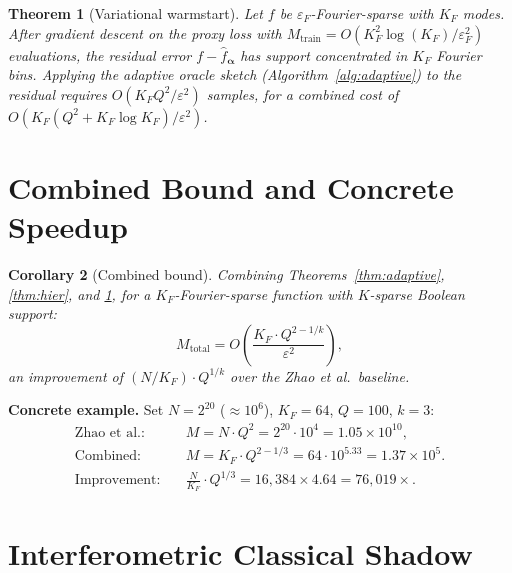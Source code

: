 \documentclass[11pt]{article}
\newtheorem{theorem}{Theorem}
\newtheorem{corollary}[theorem]{Corollary}
\newcommand{\eps}{\varepsilon}
\begin{document}
\begin{theorem}[Variational warmstart]\label{thm:var}
Let $f$ be $\eps_F$-Fourier-sparse with $K_F$ modes.  After gradient descent on the proxy loss with $M_{\mathrm{train}} = O(K_F^2\log(K_F)/\eps_F^2)$ evaluations, the residual error $f - \hat{f}_{\boldsymbol{\alpha}}$ has support concentrated in $K_F$ Fourier bins.  Applying the adaptive oracle sketch (Algorithm~\ref{alg:adaptive}) to the residual requires $O(K_F Q^2/\eps^2)$ samples, for a combined cost of $O(K_F(Q^2 + K_F\log K_F)/\eps^2)$.
\end{theorem}

\section{Combined Bound and Concrete Speedup}\label{sec:combined}

\begin{corollary}[Combined bound]\label{cor:combined}
Combining Theorems~\ref{thm:adaptive}, \ref{thm:hier}, and \ref{thm:var}, for a $K_F$-Fourier-sparse function with $K$-sparse Boolean support:
\[
  M_{\mathrm{total}} = O\!\left(\frac{K_F\cdot Q^{2-1/k}}{\eps^2}\right),
\]
an improvement of $(N/K_F)\cdot Q^{1/k}$ over the Zhao et al.\ baseline.
\end{corollary}

\noindent\textbf{Concrete example.}  Set $N=2^{20}$ ($\approx 10^6$), $K_F=64$, $Q=100$, $k=3$:
\begin{align*}
  \text{Zhao et al.:} \quad & M = N\cdot Q^2 = 2^{20}\cdot 10^4 = 1.05\times 10^{10},\\
  \text{Combined:} \quad & M = K_F\cdot Q^{2-1/3} = 64\cdot 10^{5.33} = 1.37\times 10^5.\\
  \text{Improvement:} \quad & \frac{N}{K_F}\cdot Q^{1/3} = 16{,}384\times 4.64 = 76{,}019\times.
\end{align*}

\section{Interferometric Classical Shadow}\label{sec:shadow}
\end{document}
